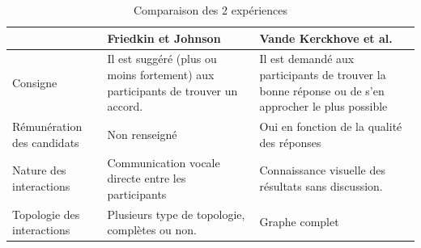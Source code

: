 \documentclass{scrreprt}
\begin{document}
\begin{table}
	\begin{tabular}{|p{4cm}|p{4.5cm}|p{4.5cm}|}
		\hline
 & Friedkin et Johnson \cite{FJ} & Vande Kerckhove et al. \cite{VMG} \tabularnewline
		\hline
Consigne & Il est suggéré (plus ou moins fortement) aux participants de trouver un accord. &Il est demandé aux participants de trouver la bonne réponse ou de s’en approcher le plus possible\tabularnewline
		\hline
Rémunération des candidats & Non renseigné & Oui en fonction de la qualité des réponses \tabularnewline
		\hline
Nature des interactions & Communication vocale directe entre les participants & Connaissance visuelle des résultats sans discussion.\tabularnewline
		\hline
Topologie des interactions & Plusieurs type de topologie, complètes ou non. & Graphe complet\tabularnewline
		\hline
	\end{tabular}
	\caption{Comparaison des 2 expériences}
\end{table}
\end{document}
